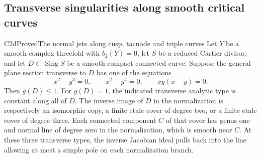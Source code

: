 \subsection{Transverse singularities along smooth critical curves}

\begin{statement}{C2d}{Proved}{The normal jets along cusp, tacnode and triple curves}
Let $Y$ be a smooth complex threefold with $b_2(Y)=0$, let $S$ be a reduced Cartier divisor, and let $D\subset\operatorname{Sing}S$ be a smooth compact connected curve. Suppose the general plane section transverse to $D$ has one of the equations
\[
 x^2-y^3=0,\qquad x^2-y^4=0,\qquad xy(x-y)=0.
 \tag{C.J.1}
\]
Then $g(D)\le1$. For $g(D)=1$, the indicated transverse analytic type is constant along all of $D$. The inverse image of $D$ in the normalization is respectively an isomorphic copy, a finite etale cover of degree two, or a finite etale cover of degree three. Each connected component $C$ of that cover has genus one and normal line of degree zero in the normalization, which is smooth near $C$. At these three transverse types, the inverse Jacobian ideal pulls back into the line allowing at most a simple pole on each normalization branch.
\end{statement}
